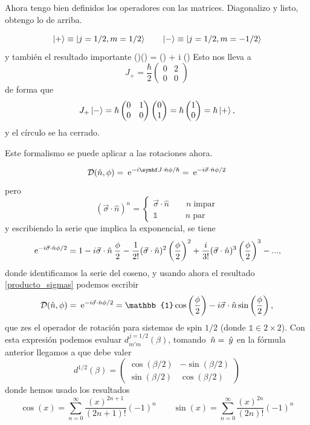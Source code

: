 \documentclass[10pt,oneside]{CBFT_book}
\begin{document}
Ahora tengo bien definidos los operadores con las matrices. Diagonalizo y listo, obtengo lo de arriba.

\[
	\Ket{+} \equiv \Ket{j=1/2 , m = 1/2} \qquad \Ket{-} \equiv \Ket{j=1/2 , m = -1/2} 
\]
y también el resultado importante
\be
	(\vec{\sigma}\cdot{})(\vec{\sigma}\cdot{}) = 
		(\cdot{}) + i \vec{\sigma}\cdot(\times{})
		\label{producto_sigmas}
\ee
Esto nos lleva a 
\[
	J_+ = \frac{\hbar}{2}\begin{pmatrix}
				0 & 2 \\
				0 & 0 
	                     \end{pmatrix}
\]
de forma que 
\[
	J_+ \Ket{-} = \hbar\begin{pmatrix}
				0 & 1 \\
				0 & 0 
	                     \end{pmatrix}
			\begin{pmatrix}
				0  \\ 1  
	                     \end{pmatrix} = \hbar 
				\begin{pmatrix}
				1  \\ 0
	                     \end{pmatrix}  = \hbar \Ket{+},
\]
y el círculo se ha cerrado.

Este formalismo se puede aplicar a las rotaciones ahora.

\[
	\mathcal{D}(\hat{n},\phi) = 
	\euler^{-i \vb{J}\cdot\hat{n}\phi/\hbar} = 
	\euler^{-i\vec{\sigma}\cdot\hat{n}\phi/2}
\]
pero 
\[
	(\vec{\sigma}\cdot\hat{n})^n = \begin{cases}
	                                \vec{\sigma}\cdot\hat{n} \qquad n \; \text{impar} \\
	                                \mathbb{1} \qquad \quad \; n \; \text{par} 
	                               \end{cases}
\]
y escribiendo la serie que implica la exponencial, se tiene
\[
	\:\mathrm{e}^{-i\vec{\sigma}\cdot\hat{n}\phi/2} = 1 - i\vec{\sigma}\cdot\hat{n} \:\frac{\phi}{2} - 
	\frac{1}{2!} (\vec{\sigma}\cdot\hat{n})^2\left(\frac{\phi}{2}\right)^2 + 
	\frac{i}{3!} (\vec{\sigma}\cdot\hat{n})^3\left(\frac{\phi}{2}\right)^3 - ...,
\]
donde identificamos la serie del coseno, y usando ahora el resultado \eqref{producto_sigmas}
podemos escribir
\[
	\mathcal{D}(\hat{n},\phi) = \euler^{-i\vec{\sigma}\cdot\hat{n}\phi/2} =
	\mathbb{1}\cos\left(\frac{\phi}{2}\right) - i\vec{\sigma}\cdot\hat{n}\sin\left(\frac{\phi}{2}\right),
\]
que zes el operador de rotación para sistemas de spin $1/2$ (donde $\mathbb{1} \in 2\times 2$). 
Con esta expresión podemos evaluar $d^{j=1/2}_{m'm}(\beta)$, tomando $\:\hat{n} = \:\hat{y}$ en la fórmula
anterior llegamos a que debe valer
\[
	d^{1/2}(\beta) = \begin{pmatrix}
	     \cos(\beta/2) & -\sin(\beta/2)\\
	     \sin(\beta/2) & \cos(\beta/2)
	    \end{pmatrix}
\]
donde hemos usado los resultados 
\[
	\cos(x) = \sum_{n=0}^\infty \frac{(x)^{2n+1}}{(2n+1)!}(-1)^n \qquad 
		\sin(x) = \sum_{n=0}^\infty \frac{(x)^{2n}}{(2n)!}(-1)^n
\]
\end{document}

